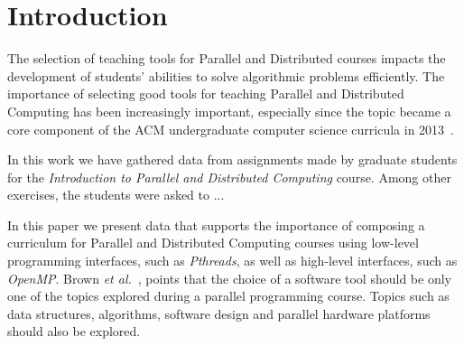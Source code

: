 \section{Introduction}
\label{sec:introduction}


The selection of teaching tools for Parallel and Distributed courses impacts
the development of students' abilities to solve algorithmic problems
efficiently. The importance of selecting good tools for teaching Parallel and
Distributed Computing has been increasingly important, especially since the
topic became a core component of the ACM undergraduate computer science
curricula in 2013~\cite{acmcurricula}.



In this work we have gathered data from assignments made by graduate students
for the \emph{Introduction to Parallel and Distributed Computing} course. Among
other exercises, the students were asked to ...


In this paper we present data that supports the importance of composing a
curriculum for Parallel and Distributed Computing courses using low-level
programming interfaces, such as \textit{Pthreads}, as well as high-level
interfaces, such as \textit{OpenMP}.  Brown \textit{et
al.}~\cite{Brown:2010:SPC:1971681.1971689}, points that the choice of a
software tool should be only one of the topics explored during a parallel
programming course. Topics such as data structures, algorithms, software design
and parallel hardware platforms should also be explored.

